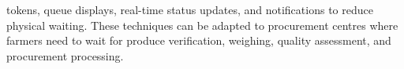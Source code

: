 \documentclass[12pt]{article}
\begin{document}
tokens, queue displays, real-time status updates, and notifications to reduce physical waiting. These techniques can be adapted to procurement centres where farmers need to wait for produce verification, weighing, quality assessment, and procurement processing.
\end{document}
